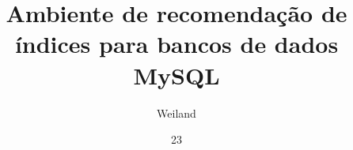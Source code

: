\documentclass[tc]{unisc}
\title{Ambiente de recomendação de índices para bancos de dados MySQL}
\author{Weiland}{Eduardo}
\date{23}{junho}{2016}
\begin{document}
\makecapa
\maketitle





\listoffigures
\listoftables
\lstlistoflistings

\tableofcontents










\end{document}
